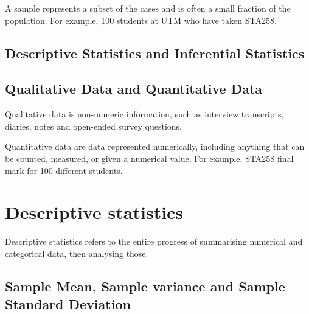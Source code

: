 \begin{definition}[Sample]	
A sample represents a subset of the cases and is often a small fraction of the population. For example, 100 students at UTM who have taken STA258.
\end{definition}

\begin{definition}	

\end{definition}

\subsection{Descriptive Statistics and Inferential Statistics}



\subsection{Qualitative Data and Quantitative Data}

\begin{definition}	
Qualitative data is non-numeric information, such as interview transcripts, diaries, notes and open-ended survey questions.
\end{definition}

\begin{definition}	
Quantitative data are data represented numerically, including anything that can be counted, measured, or given a numerical value. For example, STA258 final mark for 100 different students.
\end{definition}

\section{Descriptive statistics}

Descriptive statistics refers to the entire progress of summarising numerical and categorical data, then analysing those.\\ 

\noindent
\subsection{Sample Mean, Sample variance and Sample Standard Deviation}\\

